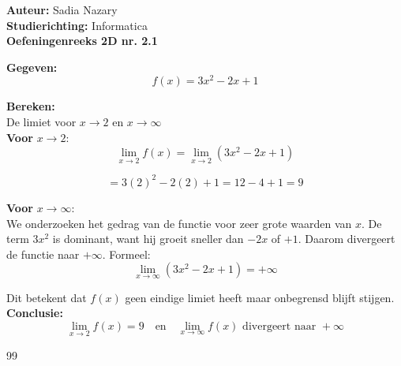 \documentclass[a4paper]{article}
\begin{document}
\noindent \large \textbf{Auteur:} Sadia Nazary \\
\noindent \large \textbf{Studierichting:} Informatica \\
\noindent \large \textbf{Oefeningenreeks 2D nr. 2.1} \\

\medskip

\normalsize

\textbf{Gegeven:} \\

$$ f(x) = 3x^2 - 2x + 1 $$

\textbf{Bereken:} \\

De limiet voor $x \to 2$ en $x \to \infty$\\

\textbf{Voor } $x \to 2$: \\

$$ \lim\limits_{x \to 2} f(x) = \lim\limits_{x \to 2} (3x^2 - 2x + 1) $$

$$ = 3(2)^2 - 2(2) + 1 = 12 - 4 + 1 = 9 $$

\textbf{Voor } $x \to \infty$: \\

We onderzoeken het gedrag van de functie voor zeer grote waarden van $x$. De term $3x^2$ is dominant, want hij groeit sneller dan $-2x$ of $+1$. Daarom divergeert de functie naar $+\infty$. Formeel:\\

$$ \lim\limits_{x \to \infty} (3x^2 - 2x + 1) = +\infty $$

Dit betekent dat $f(x)$ geen eindige limiet heeft maar onbegrensd blijft stijgen.\\

\textbf{Conclusie:} \\

$$
\lim\limits_{x \to 2} f(x) = 9 \quad \text{en} \quad \lim\limits_{x \to \infty} f(x) \text{ divergeert naar } +\infty
$$

\begin{thebibliography}{99}
\end{thebibliography}
\end{document}
